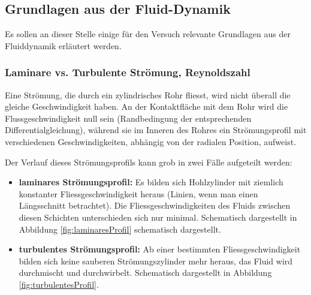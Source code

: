 \subsection{Grundlagen aus der Fluid-Dynamik}
\label{subsec:fluiddynamik}

Es sollen an dieser Stelle einige f\"ur den Versuch relevante Grundlagen aus
der Fluiddynamik erl\"autert werden.


\subsubsection{Laminare vs. Turbulente Str\"omung, Reynoldszahl}
\label{subsubsec:laminarVsTurb}

Eine  Str\"omung,  die  durch  ein  zylindrisches  Rohr  fliesst,  wird  nicht
\"uberall  die  gleiche  Geschwindigkeit  haben. An  der  Kontaktfl\"ache  mit
dem  Rohr   wird  die   Flussgeschwindigkeit  null  sein   (Randbedingung  der
entsprechenden Differentialgleichung), w\"ahrend sie im Inneren des Rohres ein
Str\"omungsprofil  mit  verschiedenen  Geschwindigkeiten, abh\"angig  von  der
radialen Position, aufweist.

Der Verlauf  dieses Str\"omungsprofils  kann grob  in zwei  F\"alle aufgeteilt
werden:

\begin{itemize}
    \item
        \textbf{laminares  Str\"omungsprofil:} Es   bilden  sich  Hohlzylinder
        mit  ziemlich konstanter  Fliessgeschwindigkeit  heraus (Linien,  wenn
        man  einen   L\"angsschnitt  betrachtet). Die  Fliessgeschwindigkeiten
        des     Fluids     zwischen     diesen     Schichten     unterschieden
        sich    nur    minimal. Schematisch     dargestellt    in    Abbildung
        \ref{fig:laminaresProfil} schematisch dargestellt.
    \item
        \textbf{turbulentes     Str\"omungsprofil:} Ab    einer     bestimmten
        Fliessgeschwindigkeit bilden  sich keine  sauberen Str\"omungszylinder
        mehr heraus, das Fluid  wird durchmischt und durchwirbelt. Schematisch
        dargestellt in Abbildung \ref{fig:turbulentesProfil}.
\end{itemize}

